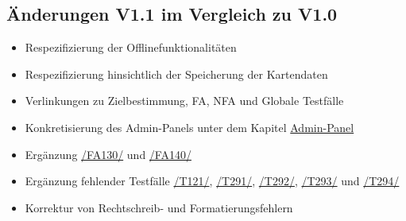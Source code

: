\subsection*{Änderungen V1.1 im Vergleich zu V1.0}

\begin{itemize}
    \item Respezifizierung der Offlinefunktionalitäten
    \item Respezifizierung hinsichtlich der Speicherung der Kartendaten
    \item Verlinkungen zu Zielbestimmung, FA, NFA und Globale Testfälle 
    \item Konkretisierung des \Gls{Admin-Panel}s unter dem Kapitel \hyperref[Admin-Panel]{Admin-Panel}
    \item Ergänzung \hyperref[/FA130/]{/FA130/} und \hyperref[/FA140/]{/FA140/}
    \item Ergänzung fehlender Testfälle \hyperref[/T121/]{/T121/}, \hyperref[/T291/]{/T291/}, \hyperref[/T292/]{/T292/}, \hyperref[/T293/]{/T293/} und \hyperref[/T294/]{/T294/}
    \item Korrektur von Rechtschreib- und Formatierungsfehlern
\end{itemize}
